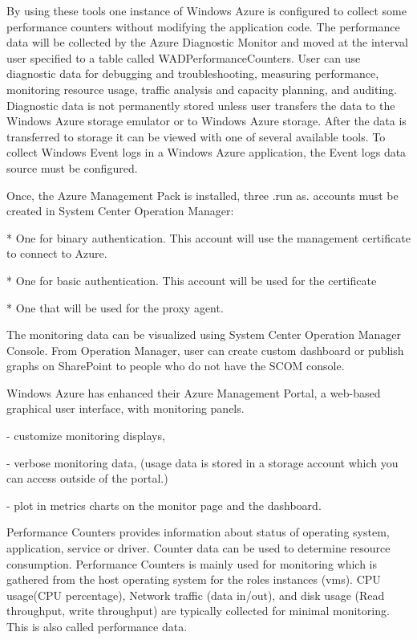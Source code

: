 \documentclass{sig-alternate}
\begin{document}
By using these tools one instance of Windows Azure is configured to collect some performance counters without modifying the application code. The performance data will be collected by the Azure Diagnostic Monitor and moved at the interval user specified to a table called WADPerformanceCounters. User can use diagnostic data for debugging and troubleshooting, measuring performance, monitoring resource usage, traffic analysis and capacity planning, and auditing. Diagnostic data is not permanently stored unless user transfers the data to the Windows Azure storage emulator or to Windows Azure storage. After the data is transferred to storage it can be viewed with one of several available tools. To collect Windows Event logs in a Windows Azure application, the Event logs data source must be configured.

Once, the Azure Management Pack is installed, three .run as. accounts must be created in System Center Operation Manager:

* One for binary authentication. This account will use the management certificate to connect to Azure.

* One for basic authentication. This account will be used for the certificate

* One that will be used for the proxy agent.

The monitoring data can be visualized using System Center Operation Manager Console. From Operation Manager, user can create custom dashboard or publish graphs on SharePoint to people who do not have the SCOM console.

Windows Azure has enhanced their Azure Management Portal, a web-based graphical user interface, with monitoring panels.

- customize monitoring displays,

- verbose monitoring data, (usage data is stored in a storage account which you can access outside of the portal.)

- plot in metrics charts on the monitor page and the dashboard.

Performance Counters provides information about status of operating system, application, service or driver. Counter data can be used to determine resource consumption. Performance Counters is mainly used for monitoring which is gathered from the host operating system for the roles instances (vms). CPU usage(CPU percentage), Network traffic (data in/out), and disk usage (Read throughput, write throughput) are typically collected for minimal monitoring. This is also called performance data.
\end{document}
